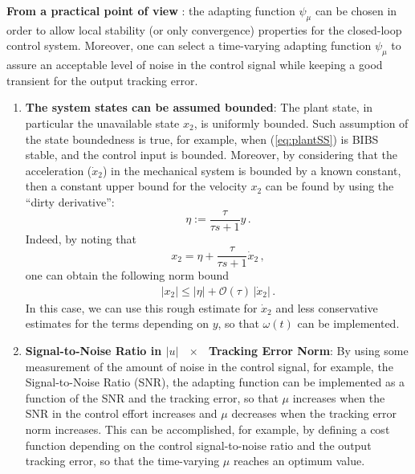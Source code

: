 \documentclass[letterpaper, 10 pt, conference]{ieeeconf}  %
\theoremstyle{plain}
\theoremstyle{definition}
\theoremstyle{remark}
\begin{document}
{\bf From a practical point of view} : the adapting function $\psi_\mu$ can be chosen in order to allow local stability (or only convergence) properties for the closed-loop control system. Moreover, one can select a time-varying adapting function $\psi_\mu$ to assure an acceptable level of noise in the control signal while keeping a good transient for the output tracking error. 
\begin{enumerate}


\item {\bf The system states can be assumed bounded}: The plant state, in particular the unavailable state $x_2$, is uniformly bounded. Such assumption of the state boundedness is true, for example, when (\ref{eq:plantSS}) is BIBS stable, and the control input is bounded. Moreover, by considering that the acceleration ($\dot{x}_2$) in the mechanical system is bounded by a known constant, then a constant  upper bound for the velocity $x_2$ can be found by using the ``dirty derivative'':
%
\begin{equation}
\eta := \frac{\tau}{\tau s+1} y\,.
\end{equation}
%
Indeed, by noting that 
%
\begin{equation}
x_2=\eta + \frac{\tau}{\tau s+1} \dot{x}_2\,,
\end{equation}
%
one can obtain the following norm bound  
%
\begin{align}
	|x_2| \leq |\eta| + \mathcal{O}(\tau) \, |\dot{x}_2| \, .
\end{align}
%
In this case, we can use this rough estimate for $\dot{x}_2$ and less conservative estimates for the terms depending on $y$, so that $\omega(t)$ can be implemented.


\item {\bf Signal-to-Noise Ratio in $|u|$ \  $\times$ \ Tracking Error Norm}: By using some measurement of the amount of noise in the control signal, for example, the Signal-to-Noise Ratio (SNR), the adapting function can be implemented as a function of the SNR and the tracking error, so that $\mu$ increases when the SNR in the control effort increases and $\mu$ decreases when the tracking error norm increases. This can be accomplished, for example, by defining a cost function depending on the control signal-to-noise ratio and the output tracking error, so that the time-varying $\mu$ reaches an optimum value.
\end{enumerate}
\end{document}
